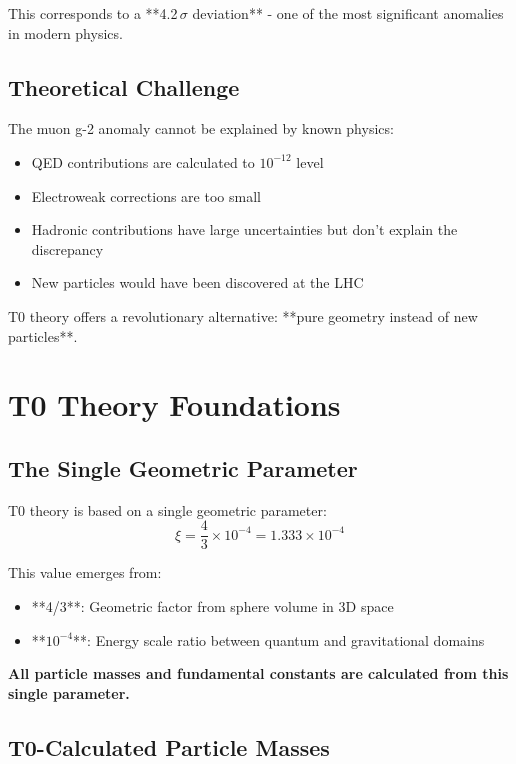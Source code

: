 \documentclass[12pt,a4paper]{article}
\numberwithin{equation}{section}
\begin{document}
	This corresponds to a **4.2$\,\sigma$ deviation** - one of the most significant anomalies in modern physics.
	
	\subsection{Theoretical Challenge}
	
	The muon g-2 anomaly cannot be explained by known physics:
	\begin{itemize}
		\item QED contributions are calculated to $10^{-12}$ level
		\item Electroweak corrections are too small
		\item Hadronic contributions have large uncertainties but don't explain the discrepancy
		\item New particles would have been discovered at the LHC
	\end{itemize}
	
	T0 theory offers a revolutionary alternative: **pure geometry instead of new particles**.
	
	\section{T0 Theory Foundations}
	
	\subsection{The Single Geometric Parameter}
	
	\begin{t0important}
		T0 theory is based on a single geometric parameter:
		\begin{equation}
			\xi = \frac{4}{3} \times 10^{-4} = 1.333 \times 10^{-4}
		\end{equation}
		
		This value emerges from:
		\begin{itemize}
			\item **4/3**: Geometric factor from sphere volume in 3D space
			\item **$10^{-4}$**: Energy scale ratio between quantum and gravitational domains
		\end{itemize}
		
		\textbf{All particle masses and fundamental constants are calculated from this single parameter.}
	\end{t0important}
	
	\subsection{T0-Calculated Particle Masses}
	
\end{document}
